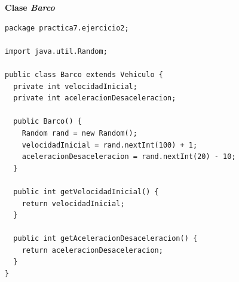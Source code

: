 \documentclass[11pt, twocolumn]{article}
\begin{document}
  \textbf{Clase \textit{Barco}}
  \begin{lstlisting}
package practica7.ejercicio2;

import java.util.Random;

public class Barco extends Vehiculo {
  private int velocidadInicial;
  private int aceleracionDesaceleracion;

  public Barco() {
    Random rand = new Random();
    velocidadInicial = rand.nextInt(100) + 1;
    aceleracionDesaceleracion = rand.nextInt(20) - 10;
  }

  public int getVelocidadInicial() {
    return velocidadInicial;
  }

  public int getAceleracionDesaceleracion() {
    return aceleracionDesaceleracion;
  }
}
  \end{lstlisting}
\end{document}
